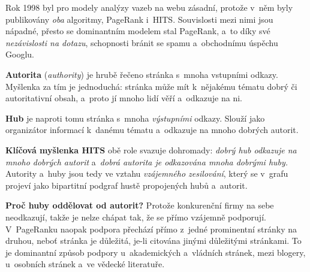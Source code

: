 \documentclass[11pt,a4paper]{article}
\theoremstyle{definition}
\begin{document}
Rok 1998 byl pro modely analýzy vazeb na webu zásadní, protože v~něm byly publikovány
\emph{oba} algoritmy, PageRank i~HITS. Souvislosti mezi nimi jsou nápadné, přesto se
dominantním modelem stal PageRank, a~to díky své \emph{nezávislosti na dotazu}, schopnosti
bránit se spamu a~obchodnímu úspěchu Googlu.

\begin{defbox}
\textbf{Autorita} (\emph{authority}) je hrubě řečeno stránka s~mnoha vstupními odkazy. Myšlenka
za tím je jednoduchá: stránka může mít k~nějakému tématu dobrý či autoritativní obsah, a~proto
jí mnoho lidí věří a~odkazuje na ni.

\textbf{Hub} je naproti tomu stránka s~mnoha \emph{výstupními} odkazy. Slouží jako organizátor
informací k~danému tématu a~odkazuje na mnoho dobrých autorit.

\textbf{Klíčová myšlenka HITS} obě role svazuje dohromady: \emph{dobrý hub odkazuje na mnoho
dobrých autorit} a~\emph{dobrá autorita je odkazována mnoha dobrými huby.} Autority a~huby jsou
tedy ve vztahu \emph{vzájemného zesilování}, který se v~grafu projeví jako bipartitní podgraf
hustě propojených hubů a~autorit.

\textbf{Proč huby oddělovat od autorit?} Protože konkurenční firmy na sebe neodkazují, takže je
nelze chápat tak, že se přímo vzájemně podporují. V~PageRanku naopak podpora přechází přímo
z~jedné prominentní stránky na druhou, neboť stránka je důležitá, je-li citována jinými
důležitými stránkami. To je dominantní způsob podpory u~akademických a~vládních stránek, mezi
blogery, u~osobních stránek a~ve vědecké literatuře.
\end{defbox}
\end{document}
